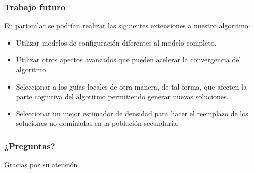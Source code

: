 \documentclass[10pt,compress]{beamer}
\begin{document}
\begin{frame}
	\frametitle{Trabajo futuro}	
	
\begin{block}{En particular se podr\'ian realizar las siguientes extensiones a nuestro algoritmo:}
  
  \begin{itemize}
		\item Utilizar modelos de configuraci\'on diferentes al modelo completo.
		\item Utilizar otros apectos avanzados que pueden acelerar la convergencia del algoritmo.  
		\item Seleccionar a los gu\'ias locales de otra manera, de tal forma, que afecten la parte cognitiva del algoritmo permitiendo
 generar nuevas soluciones.
		\item Seleccionar un mejor estimador de densidad para hacer el reemplazo de los soluciones no dominadas en la poblaci\'on secundaria.
	\end{itemize}
	\end{block}
\end{frame}
\begin{frame}
	\frametitle{¿Preguntas?}
	\begin{center} {\huge Gracias por su atenci\'on}
	\end{center}

\end{frame}
\end{document}
